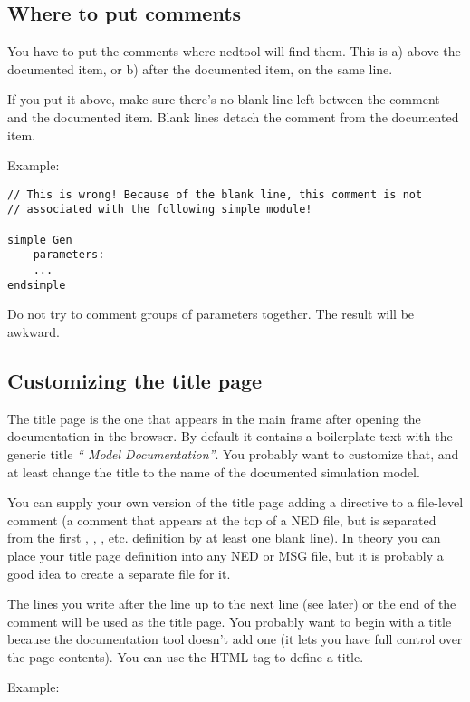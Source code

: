 \subsection{Where to put comments}

You have to put the comments where nedtool will find them.
This is a) above the documented item, or b) after the
documented item, on the same line.

If you put it above, make sure there's no blank line left
between the comment and the documented item. Blank lines
detach the comment from the documented item.

Example:
\begin{verbatim}
// This is wrong! Because of the blank line, this comment is not
// associated with the following simple module!

simple Gen
    parameters:
    ...
endsimple
\end{verbatim}

Do not try to comment groups of parameters together. The result
will be awkward.


\subsection{Customizing the title page}

The title page is the one that appears in the main frame after
opening the documentation in the browser. By default it contains
a boilerplate text with the generic title \textit{``{\opp} Model Documentation''}.
You probably want to customize that, and at least change the title
to the name of the documented simulation model.

You can supply your own version of the title page adding a 
directive to a file-level comment (a comment that appears at the top of
a NED file, but is separated from the first , ,
, etc. definition by at least one blank line).
In theory you can place your title page definition into
any NED or MSG file, but it is probably a good idea to create
a separate  file for it.

The lines you write after the  line up to the next
 line (see later) or the end of the comment will be used
as the title page.
You probably want to begin with a title because the documentation
tool doesn't add one (it lets you have full control over the
page contents). You can use the  HTML tag
to define a title.

Example:

